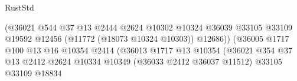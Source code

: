 \begin{lexlean}{RustStd}
\begin{coremodule}
                                                            (@36021
                                                              @544
                                                              @37
                                                              @13
                                                              @2444
                                                              @2624
                                                              @10302
                                                              @10324
                                                              @36039
                                                              @33105
                                                              @33109
                                                              @19592
                                                              @12456
                                                              (@11772 (@18073 @10324 @10303))
                                                              @12686))
                                                          (@36005
                                                            @1717
                                                            @100
                                                            @13
                                                            @16
                                                            @10354
                                                            @2414
                                                            (@36013
                                                              @1717
                                                              @13
                                                              @10354
                                                              (@36021
                                                                @354
                                                                @37
                                                                @13
                                                                @2412
                                                                @2624
                                                                @10334
                                                                @10349
                                                                (@36033 @2412 @36037 @11512)
                                                                @33105
                                                                @33109
                                                                @18834

\end{coremodule}
\end{lexlean}

